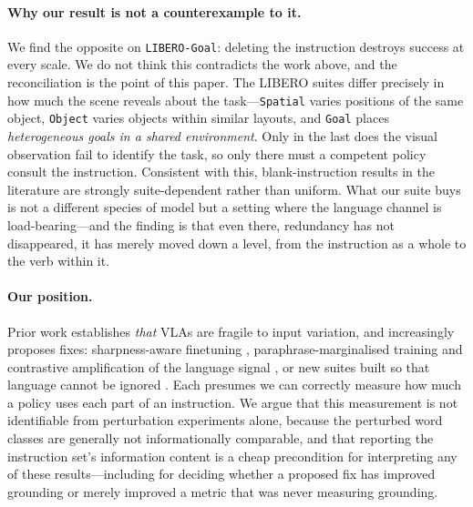 \documentclass[11pt]{article}
\begin{document}
\paragraph{Why our result is not a counterexample to it.} We find the opposite on
\texttt{LIBERO-Goal}: deleting the instruction destroys success at every scale. We
do not think this contradicts the work above, and the reconciliation is the point of
this paper. The LIBERO suites differ precisely in how much the scene reveals about
the task---\texttt{Spatial} varies positions of the same object,
\texttt{Object} varies objects within similar layouts, and \texttt{Goal} places
\emph{heterogeneous goals in a shared environment}. Only in the last does the visual
observation fail to identify the task, so only there must a competent policy consult
the instruction. Consistent with this, blank-instruction results in the literature
are strongly suite-dependent rather than uniform. What our suite buys is not a
different species of model but a setting where the language channel is
load-bearing---and the finding is that even there, redundancy has not disappeared,
it has merely moved down a level, from the instruction as a whole to the verb within
it.

\paragraph{Our position.} Prior work establishes \emph{that} VLAs are fragile to
input variation, and increasingly proposes fixes: sharpness-aware finetuning
\citep{zhang2026flatness}, paraphrase-marginalised training and contrastive
amplification of the language signal \citep{zhan2026stable}, or new suites built so
that language cannot be ignored \citep{hou2026langgap,chen2026radar}. Each presumes
we can correctly measure how much a policy uses each part of an instruction. We
argue that this measurement is not identifiable from perturbation experiments alone,
because the perturbed word classes are generally not informationally comparable, and
that reporting the instruction set's information content is a cheap precondition for
interpreting any of these results---including for deciding whether a proposed fix
has improved grounding or merely improved a metric that was never measuring
grounding.
\end{document}
